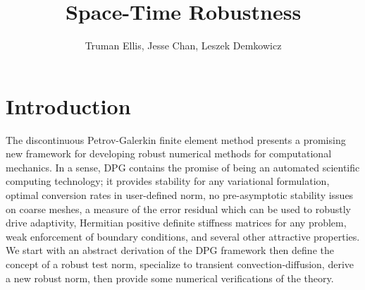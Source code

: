 \documentclass{article}
\title{Space-Time Robustness}
\author{Truman Ellis, Jesse Chan, Leszek Demkowicz}
\date{}
\begin{document}
\maketitle







\section{Introduction}
The discontinuous Petrov-Galerkin finite element method presents a promising new framework for developing robust numerical methods for computational mechanics.
In a sense, DPG contains the promise of being an automated scientific computing technology; it provides stability for any variational formulation, optimal conversion rates in user-defined norm, no pre-asymptotic stability issues on coarse meshes, a measure of the error residual which can be used to robustly drive adaptivity, Hermitian positive definite stiffness matrices for any problem, weak enforcement of boundary conditions, and several other attractive properties.
We start with an abstract derivation of the DPG framework then define the concept of a robust test norm, specialize to transient convection-diffusion, derive a new robust norm, then provide some numerical verifications of the theory.
\end{document}
